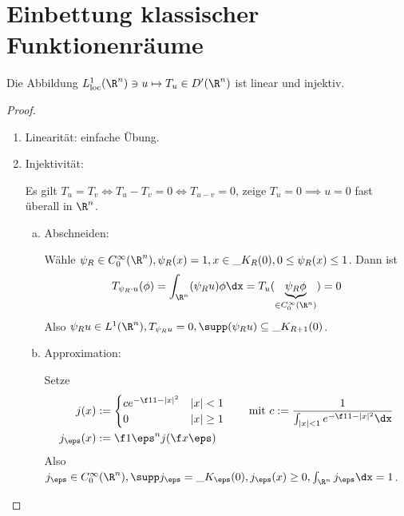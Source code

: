 \section{Einbettung klassischer Funktionenräume}


\begin{st} \label{5.7}
	Die Abbildung $L_{\text{loc}}^1(\R^n) \ni u \mapsto T_u \in D'(\R^n)$ ist linear und injektiv.
	\begin{proof}
		\begin{enumerate}[1)]
			\item
				Linearität: einfache Übung.
			\item
				Injektivität:
				
				Es gilt $T_u = T_v \iff T_u - T_v = 0 \iff T_{u-v} = 0$, zeige $T_u = 0 \implies u = 0$ fast überall in $\R^n$.
				\begin{enumerate}[a)]
					\item
						Abschneiden:

						Wähle $\psi_R \in C_0^\infty(\R^n), \psi_R(x) = 1, x \in \_{K_R(0)}, 0 \le \psi_{R}(x) \le 1$.
						Dann ist
						\[
							T_{\psi_R \cdot u} (\phi) 
							= \int_{\R^n} (\psi_R u) \phi \dx 
							= T_u (\underbrace{\psi_R \phi}_{\in C_0^\infty(\R^n)})
							= 0
						\]
						Also $\psi_R u \in L^1(\R^n), T_{\psi_R u} = 0, \supp(\psi_R u) \subset \_{K_{R+1}(0)}$.
					\item
						Approximation:

						Setze
						\begin{align*}
							j(x) &:= \begin{cases}
								c e^{-\f 1{1-|x|^2}} & |x| < 1 \\
								0 & |x| \ge 1
							\end{cases} \qquad \text{mit }
							c := \dfrac 1{\int_{|x|< 1} e^{-\f 1{1-|x|^2}} \dx} \\
							j_\eps(x) &:= \f 1{\eps^n} j(\f x\eps)
						\end{align*}
						Also $j_\eps \in C_0^\infty(\R^n), \supp j_\eps = \_{K_\eps(0)}, j_\eps(x) \ge 0, \int_{\R^n} j_\eps \dx = 1$.


\end{enumerate}
\end{enumerate}
\end{proof}
\end{st}
